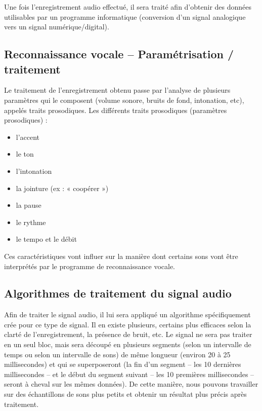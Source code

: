 \documentclass[a4paper, 12pt]{book}
\newcounter{program}[subsection]
\begin{document}
Une fois l’enregistrement audio effectué, il sera traité afin d’obtenir des données utilisables par un programme informatique (conversion d’un signal analogique vers un signal numérique/digital).

\subsection{Reconnaissance vocale – Paramétrisation / traitement}

Le traitement de l’enregistrement obtenu passe par l’analyse de plusieurs paramètres qui le composent (volume sonore, bruits de fond, intonation, etc), appelés traits prosodiques. Les différents traits prosodiques (paramètres prosodiques) :

\begin{itemize}
    \item l’accent 
    \item le ton 
    \item l’intonation 
    \item la jointure (ex : « coopérer ») 
    \item la pause 
    \item le rythme
    \item le tempo et le débit
\end{itemize}

Ces caractéristiques vont influer sur la manière dont certains sons vont être interprétés par le programme de reconnaissance vocale.

\subsection{Algorithmes de traitement du signal audio}

Afin de traiter le signal audio, il lui sera appliqué un algorithme spécifiquement crée pour ce type de signal. Il en existe plusieurs, certains plus efficaces selon la clarté de l’enregistrement, la présence de bruit, etc. Le signal ne sera pas traiter en un seul bloc, mais sera découpé en plusieurs segments (selon un intervalle de temps ou selon un intervalle de sons) de même longueur (environ 20 à 25 millisecondes) et qui se superposeront (la fin d’un segment – les 10 dernières millisecondes – et le début du segment suivant – les 10 premières millisecondes – seront à cheval sur les mêmes données). De cette manière, nous pouvons travailler sur des échantillons de sons plus petits et obtenir un résultat plus précis après traitement.
\end{document}
